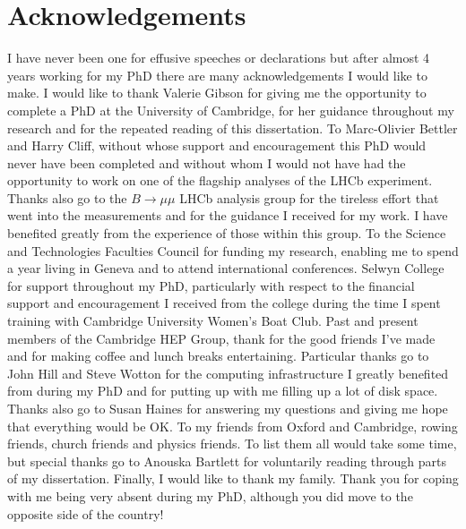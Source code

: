 




\chapter{Acknowledgements}

I have never been one for effusive speeches or declarations but after almost 4 years working for my PhD there are many acknowledgements I would like to make. %
I would like to thank Valerie Gibson for giving me the opportunity to complete a PhD at the University of Cambridge, for her guidance throughout my research and for the repeated reading of this dissertation. %
To Marc-Olivier Bettler and Harry Cliff, without whose support and encouragement this PhD would never have been completed and without whom I would not have had the opportunity to work on one of the flagship analyses of the LHCb experiment.
Thanks also go to the $B \to \mu\mu$ LHCb analysis group for the tireless effort that went into the \BF measurements and for the guidance I received for my work. I have benefited greatly from the experience of those within this group. 
To the Science and Technologies Faculties Council for funding my research, enabling me to spend a year living in Geneva and to attend international conferences. Selwyn College for support throughout my PhD, particularly with respect to the financial support and encouragement I received from the college during the time I spent training with Cambridge University Women's Boat Club. %
Past and present members of the Cambridge HEP Group, thank for the good friends I've made and for making coffee and lunch breaks entertaining. Particular thanks go to John Hill and Steve Wotton for the computing infrastructure I greatly benefited from during my PhD and for putting up with me filling up a lot of disk space. Thanks also go to Susan Haines for answering my questions and giving me hope that everything would be OK. 
To my friends from Oxford and Cambridge, rowing friends, church friends and physics friends. To list them all would take some time, but special thanks go to Anouska Bartlett for voluntarily reading through parts of my dissertation. %
Finally, I would like to thank my family. Thank you for coping with me being very absent during my PhD, although you did move to the opposite side of the country! 

